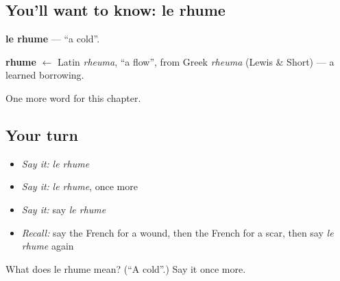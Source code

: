 \subsection*{You'll want to know: le rhume}
\textbf{le rhume} — \textquotedblleft{}a cold\textquotedblright{}.

\begin{cousinweb}
\textbf{rhume} $\leftarrow$ Latin \emph{rheuma}, \textquotedblleft{}a flow\textquotedblright{}, from Greek \emph{rheuma} (Lewis \& Short) — a learned borrowing.
\end{cousinweb}

\begin{grammarlens}[title={What you've built}]
One more word for this chapter.
\end{grammarlens}

\subsection*{Your turn}
\begin{itemize}
\raggedright
  \item \emph{Say it:} \emph{le rhume}
  \item \emph{Say it:} \emph{le rhume}, once more
  \item \emph{Say it:} say \emph{le rhume}
  \item \emph{Recall:} say the French for a wound, then the French for a scar, then say \emph{le rhume} again
\end{itemize}

\begin{tcolorbox}[breakable,colback=teal!4,colframe=teal!35!black,title={Before you move on}]
What does le rhume mean? (\textquotedblleft{}A cold\textquotedblright{}.) Say it once more.
\end{tcolorbox}
